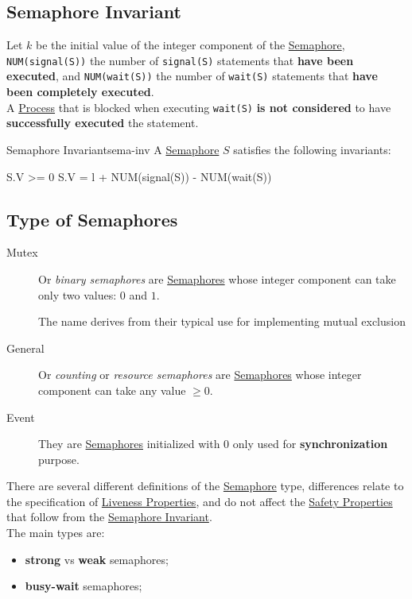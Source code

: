 \subsection{Semaphore Invariant}\label{sub:pi_semaphore_invariant} %
Let $k$ be the initial value of the integer component of the \hyperref[def:semaphore]{Semaphore}, \texttt{NUM(signal(S))} the number of \texttt{signal(S)} statements that \textbf{have been executed}, and \texttt{NUM(wait(S))} the number of \texttt{wait(S)} statements that \textbf{have been completely executed}.
\\
A \hyperref[def:process]{Process} that is blocked when executing \texttt{wait(S)} \textbf{is not considered} to have \textbf{successfully executed} the statement.
\begin{theorem}{Semaphore Invariant}{sema-inv}
    A \hyperref[def:semaphore]{Semaphore} $S$ satisfies the following invariants:
    \begin{codeblock}{}
    S.V >= 0
    S.V = l + NUM(signal(S)) - NUM(wait(S))
    \end{codeblock}
\end{theorem}
%
\subsection{Type of Semaphores}\label{sub:pi_type_of_semaphores} %
\begin{description}
    \item[Mutex] Or \textit{binary semaphores} are \hyperref[def:semaphore]{Semaphores} whose integer component can take only two values: $0$ and $1$.
        \begin{note}
            The name derives from their typical use for implementing mutual exclusion
        \end{note}
    \item[General] Or \textit{counting} or \textit{resource semaphores} are \hyperref[def:semaphore]{Semaphores} whose integer component can take any value $\ge 0$.
    \item[Event] They are \hyperref[def:semaphore]{Semaphores} initialized with $0$ only used for \textbf{synchronization} purpose.
\end{description}
There are several different definitions of the \hyperref[def:semaphore]{Semaphore} type, differences relate to the specification of \hyperref[def:liveness-prop]{Liveness Properties}, and do not affect the \hyperref[def:safety-prop]{Safety Properties} that follow from the \hyperref[th:sema-inv]{Semaphore Invariant}.
\\
The main types are:
\begin{itemize}
    \item \textbf{strong} vs \textbf{weak} semaphores;
    \item \textbf{busy-wait} semaphores;
\end{itemize}
%
